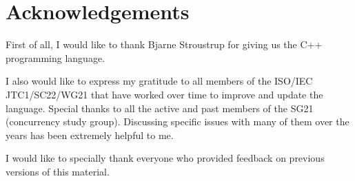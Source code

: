\chapter*{Acknowledgements}

First of all, I would like to thank Bjarne Stroustrup for giving us 
the C++ programming language.

I also would like to express my gratitude to all members of the ISO/IEC
JTC1/SC22/WG21 that have worked over time to improve and update the language.
Special thanks to all the active and past members of the SG21 (concurrency
study group).
Discussing specific issues with many of them over the years has been extremely
helpful to me. 

I would like to specially thank everyone who provided feedback 
on previous versions of this material. 
